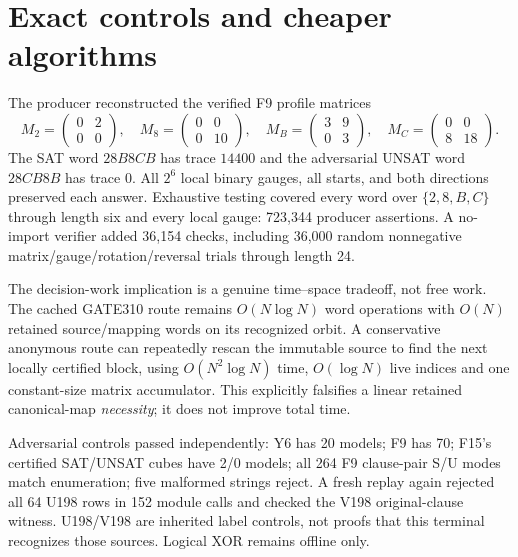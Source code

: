 \documentclass[11pt]{article}
\begin{document}
\section{Exact controls and cheaper algorithms}
The producer reconstructed the verified F9 profile matrices
\[
M_2=\begin{pmatrix}0&2\\0&0\end{pmatrix},\quad
M_8=\begin{pmatrix}0&0\\0&10\end{pmatrix},\quad
M_B=\begin{pmatrix}3&9\\0&3\end{pmatrix},\quad
M_C=\begin{pmatrix}0&0\\8&18\end{pmatrix}.
\]
The SAT word $28B8CB$ has trace $14400$ and the adversarial UNSAT word
$28CB8B$ has trace $0$.  All $2^6$ local binary gauges, all starts, and both
directions preserved each answer.  Exhaustive testing covered every word over
$\{2,8,B,C\}$ through length six and every local gauge: 723,344 producer
assertions.  A no-import verifier added 36,154 checks, including 36,000 random
nonnegative matrix/gauge/rotation/reversal trials through length 24.

The decision-work implication is a genuine time--space tradeoff, not free work.
The cached GATE310 route remains $O(N\log N)$ word operations with $O(N)$ retained
source/mapping words on its recognized orbit.  A conservative anonymous route can
repeatedly rescan the immutable source to find the next locally certified block,
using $O(N^2\log N)$ time, $O(\log N)$ live indices and one constant-size matrix
accumulator.  This explicitly falsifies a linear retained canonical-map
\emph{necessity}; it does not improve total time.

Adversarial controls passed independently: Y6 has 20 models; F9 has 70; F15's
certified SAT/UNSAT cubes have 2/0 models; all 264 F9 clause-pair S/U modes match
enumeration; five malformed strings reject.  A fresh replay again rejected all
64 U198 rows in 152 module calls and checked the V198 original-clause witness.
U198/V198 are inherited label controls, not proofs that this terminal recognizes
those sources.  Logical XOR remains offline only.
\end{document}
